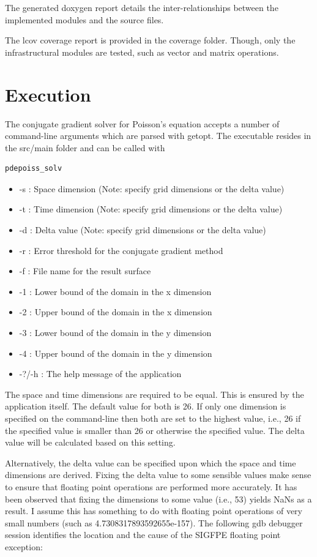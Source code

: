 \documentclass[12pt,a4paper]{report}
\begin{document}
The generated doxygen report details the inter-relationships between
the implemented modules and the source files.

The lcov coverage report is provided in the coverage folder. Though,
only the infrastructural modules are tested, such as vector and matrix
operations.

\section{Execution}
\label{sec:execution}

The conjugate gradient solver for Poisson's equation accepts a number
of command-line arguments which are parsed with getopt. The executable
resides in the src/main folder and can be
called with \begin{verbatim}pdepoiss_solv\end{verbatim}

\begin{itemize}
\item -s : Space dimension (Note: specify grid dimensions or the delta
  value)
\item -t : Time dimension (Note: specify grid dimensions or the delta
  value)
\item -d : Delta value (Note: specify grid dimensions or the delta
  value)
\item -r : Error threshold for the conjugate gradient method
\item -f : File name for the result surface
\item -1 : Lower bound of the domain in the x dimension
\item -2 : Upper bound of the domain in the x dimension
\item -3 : Lower bound of the domain in the y dimension
\item -4 : Upper bound of the domain in the y dimension
\item -?/-h : The help message of the application
\end{itemize}

The space and time dimensions are required to be equal. This is
ensured by the application itself. The default value for both is
26. If only one dimension is specified on the command-line then both
are set to the highest value, i.e., 26 if the specified value is
smaller than 26 or otherwise the specified value. The delta value will
be calculated based on this setting.

Alternatively, the delta value can be specified upon which the space
and time dimensions are derived. Fixing the delta value to some
sensible values make sense to ensure that floating point operations
are performed more accurately. It has been observed that fixing the
dimensions to some value (i.e., 53) yields NaNs as a result. I assume
this has something to do with floating point operations of very small
numbers (such as 4.7308317893592655e-157). The following gdb debugger
session identifies the location and the cause of the SIGFPE floating
point exception:
\end{document}
